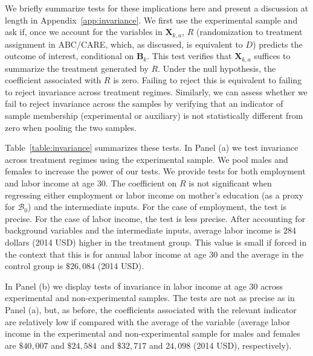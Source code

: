 We briefly summarize tests for these implications here and present a discussion at length in Appendix~\ref{app:invariance}. We first use the experimental sample and ask if, once we account for the variables in $\bm{X}_{k,a}$, $R$ (randomization to treatment assignment in ABC/CARE, which, as discussed, is equivalent to $D$) predicts the outcome of interest, conditional on $\bm{B}_k$. This test verifies that $\bm{X}_{k,a}$ suffices to summarize the treatment generated by $R$. Under the null hypothesis, the coefficient associated with $R$ is zero. Failing to reject this is equivalent to failing to reject invariance across treatment regimes. Similarly, we can assess whether we fail to reject invariance across the samples by verifying that an indicator of sample membership (experimental or auxiliary) is not statistically different from zero when pooling the two samples.

Table~\ref{table:invariance} summarizes these tests. In Panel (a) we test invariance across treatment regimes using the experimental sample. We pool males and females to increase the power of our tests. We provide tests for both employment and labor income at age 30. The coefficient on $R$ is not significant when regressing either employment or labor income on mother's education (as a proxy for $\mathcal{B}_{0}$) and the intermediate inputs. For the case of employment, the test is precise. For the case of labor income, the test is less precise. After accounting for background variables and the intermediate inputs, average labor income is $284$ dollars (2014 USD) higher in the treatment group. This value is small if forced in the context that this is for annual labor income at age 30 and the average in the control group is $\$26,084$ (2014 USD).

In Panel (b) we display tests of invariance in labor income at age 30 across experimental and non-experimental samples. The tests are not as precise as in Panel (a), but, as before, the coefficients associated with the relevant indicator are relatively low if compared with the average of the variable (average labor income in the experimental and non-experimental sample for males and females are $\$40,007$ and $\$24,584$ \,and  $\$32,717$ and $24,098$ (2014 USD), respectively).\\


